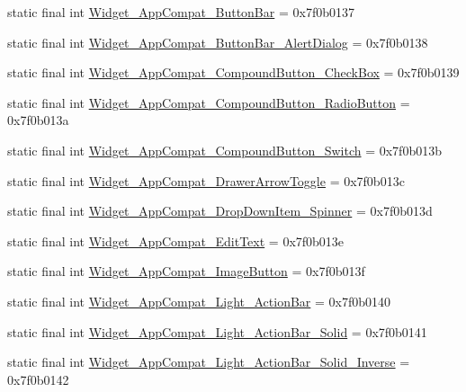 \begin{CompactItemize}
\item 
static final int \hyperlink{classandroid_1_1support_1_1v7_1_1palette_1_1_r_1_1style_fb278700f0c7ac94e8a5bb3be0dcf371}{Widget\_\-AppCompat\_\-ButtonBar} = 0x7f0b0137
\item 
static final int \hyperlink{classandroid_1_1support_1_1v7_1_1palette_1_1_r_1_1style_54a3ff37df48d33437193251e0575b7e}{Widget\_\-AppCompat\_\-ButtonBar\_\-AlertDialog} = 0x7f0b0138
\item 
static final int \hyperlink{classandroid_1_1support_1_1v7_1_1palette_1_1_r_1_1style_4666184ea1bbd18d36b44f336d67b125}{Widget\_\-AppCompat\_\-CompoundButton\_\-CheckBox} = 0x7f0b0139
\item 
static final int \hyperlink{classandroid_1_1support_1_1v7_1_1palette_1_1_r_1_1style_20a21bcd06c9a648815fb9fc8e68c6ea}{Widget\_\-AppCompat\_\-CompoundButton\_\-RadioButton} = 0x7f0b013a
\item 
static final int \hyperlink{classandroid_1_1support_1_1v7_1_1palette_1_1_r_1_1style_ffb6eca5664a3c43206ffb88171a0e10}{Widget\_\-AppCompat\_\-CompoundButton\_\-Switch} = 0x7f0b013b
\item 
static final int \hyperlink{classandroid_1_1support_1_1v7_1_1palette_1_1_r_1_1style_3c2a5a1b86a60bef7ae664c41709a8eb}{Widget\_\-AppCompat\_\-DrawerArrowToggle} = 0x7f0b013c
\item 
static final int \hyperlink{classandroid_1_1support_1_1v7_1_1palette_1_1_r_1_1style_4a0358f8c731c55a4cedb92d3220691c}{Widget\_\-AppCompat\_\-DropDownItem\_\-Spinner} = 0x7f0b013d
\item 
static final int \hyperlink{classandroid_1_1support_1_1v7_1_1palette_1_1_r_1_1style_90b912f17b3b9da0532881f9d0a60240}{Widget\_\-AppCompat\_\-EditText} = 0x7f0b013e
\item 
static final int \hyperlink{classandroid_1_1support_1_1v7_1_1palette_1_1_r_1_1style_212dfae5296e9155b6f484900f45ed93}{Widget\_\-AppCompat\_\-ImageButton} = 0x7f0b013f
\item 
static final int \hyperlink{classandroid_1_1support_1_1v7_1_1palette_1_1_r_1_1style_4e8bd917ab1dd103ebb1e50beb1edc1d}{Widget\_\-AppCompat\_\-Light\_\-ActionBar} = 0x7f0b0140
\item 
static final int \hyperlink{classandroid_1_1support_1_1v7_1_1palette_1_1_r_1_1style_a11513427aeb8055a697fcc90ae11053}{Widget\_\-AppCompat\_\-Light\_\-ActionBar\_\-Solid} = 0x7f0b0141
\item 
static final int \hyperlink{classandroid_1_1support_1_1v7_1_1palette_1_1_r_1_1style_2063c17219033beea91a5b6822115e02}{Widget\_\-AppCompat\_\-Light\_\-ActionBar\_\-Solid\_\-Inverse} = 0x7f0b0142

\end{CompactItemize}
